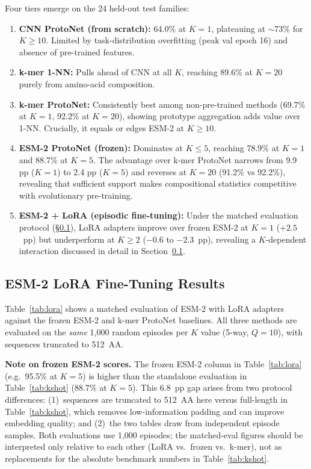 \documentclass[11pt,a4paper]{article}
\begin{document}
\noindent Four tiers emerge on the 24 held-out test families:
\begin{enumerate}[noitemsep,leftmargin=*]
  \item \textbf{CNN ProtoNet (from scratch):} 64.0\% at $K=1$, plateauing at
        $\sim$73\% for $K \geq 10$.  Limited by task-distribution overfitting
        (peak val epoch 16) and absence of pre-trained features.
  \item \textbf{k-mer 1-NN:} Pulls ahead of CNN at all $K$,
        reaching 89.6\% at $K=20$ purely from amino-acid composition.
  \item \textbf{k-mer ProtoNet:} Consistently best among non-pre-trained methods
        (69.7\% at $K=1$, 92.2\% at $K=20$), showing prototype aggregation
        adds value over 1-NN.  Crucially, it equals or edges ESM-2 at $K \geq 10$.
  \item \textbf{ESM-2 ProtoNet (frozen):} Dominates at $K \leq 5$, reaching 78.9\%
        at $K=1$ and 88.7\% at $K=5$.  The advantage over k-mer ProtoNet narrows
        from 9.9 pp ($K=1$) to 2.4 pp ($K=5$) and reverses at $K=20$
        (91.2\% vs 92.2\%), revealing that sufficient support makes compositional
        statistics competitive with evolutionary pre-training.
  \item \textbf{ESM-2 + LoRA (episodic fine-tuning):} Under the matched
        evaluation protocol (\S\ref{sec:lora_results}), LoRA adapters improve
        over frozen ESM-2 at $K=1$ ($+2.5$~pp) but underperform at $K \geq 2$
        ($-0.6$ to $-2.3$~pp), revealing a $K$-dependent interaction discussed
        in detail in Section~\ref{sec:lora_results}.
\end{enumerate}

\subsection{ESM-2 LoRA Fine-Tuning Results}
\label{sec:lora_results}

Table~\ref{tab:lora} shows a matched evaluation of ESM-2 with LoRA adapters
against the frozen ESM-2 and k-mer ProtoNet baselines.  All three methods are
evaluated on the \emph{same} 1,000 random episodes per $K$ value (5-way,
$Q=10$), with sequences truncated to 512~AA.

\noindent\textbf{Note on frozen ESM-2 scores.}  The frozen ESM-2 column in
Table~\ref{tab:lora} (e.g.\ 95.5\% at $K=5$) is higher than the standalone
evaluation in Table~\ref{tab:kshot} (88.7\% at $K=5$).  This 6.8~pp gap
arises from two protocol differences: (1)~sequences are truncated to
512~AA here versus full-length in Table~\ref{tab:kshot}, which removes
low-information padding and can improve embedding quality; and
(2)~the two tables draw from independent episode samples.  Both evaluations
use 1{,}000 episodes; the matched-eval figures should be interpreted only
relative to each other (LoRA vs.\ frozen vs.\ k-mer), not as replacements
for the absolute benchmark numbers in Table~\ref{tab:kshot}.
\end{document}
